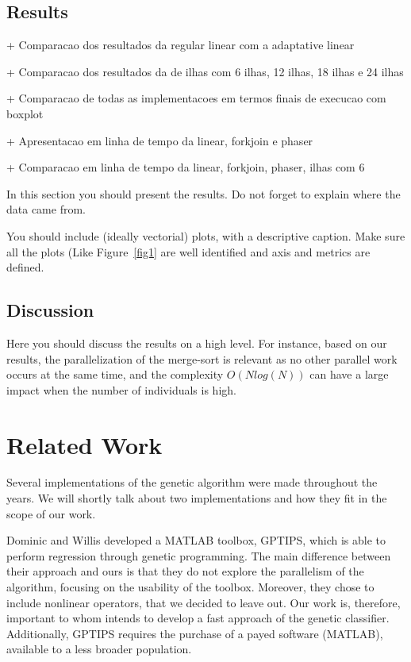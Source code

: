 \documentclass[runningheads]{llncs}
\begin{document}
\subsection{Results}

+ Comparacao dos resultados da regular linear com a adaptative linear

+ Comparacao dos resultados da de ilhas com 6 ilhas, 12 ilhas, 18 ilhas e 24 ilhas

+ Comparacao de todas as implementacoes em termos finais de execucao com boxplot

+ Apresentacao em linha de tempo da linear, forkjoin e phaser

+ Comparacao em linha de tempo da linear, forkjoin, phaser, ilhas com 6

In this section you should present the results. Do not forget to explain where the data came from. 

You should include (ideally vectorial) plots, with a descriptive caption. Make sure all the plots (Like Figure~\ref{fig1} are well identified and axis and metrics are defined.



\subsection{Discussion}

Here you should discuss the results on a high level. For instance, based on our results, the parallelization of the merge-sort is relevant as no other parallel work occurs at the same time, and the complexity $O(N log(N))$ can have a large impact when the number of individuals is high.

\section{Related Work}

Several implementations of the genetic algorithm were made throughout the years. We will shortly talk about two implementations and how they fit in the scope of our work.

Dominic and Willis  \cite{GPTIPS} developed a MATLAB toolbox, GPTIPS, which is able to perform regression through genetic programming. The main difference between their approach and  ours is that they do not explore the parallelism of the algorithm, focusing on the usability of the toolbox. Moreover, they chose to include nonlinear operators, that we decided to leave out. Our work is, therefore, important to whom intends to develop a fast approach of the genetic classifier. Additionally, GPTIPS requires the purchase of a payed software (MATLAB), available to a less broader population.
\end{document}
